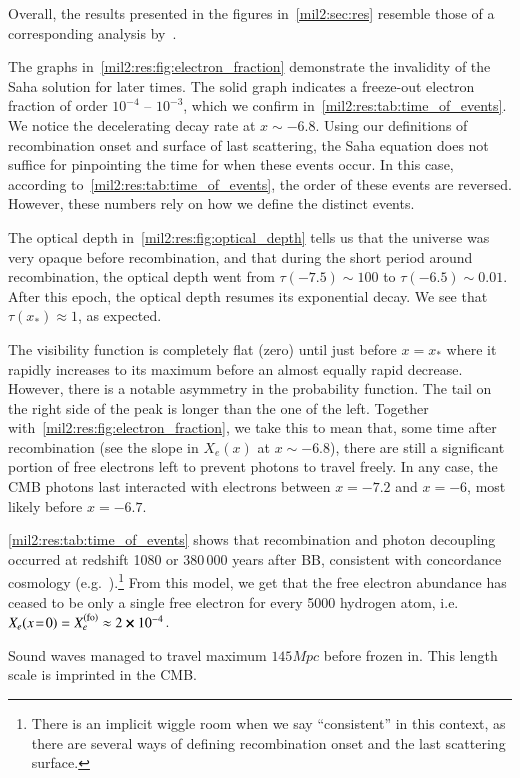 



Overall, the results presented in the figures in~\cref{mil2:sec:res} resemble those of a corresponding analysis by~\citet[see][Fig.~1,~2]{Callin2006}.


The graphs in~\cref{mil2:res:fig:electron_fraction} demonstrate the invalidity of the Saha solution for later times. The solid graph indicates a freeze-out electron fraction of order $10^{-4}$ -- $10^{-3}$, which we confirm in~\cref{mil2:res:tab:time_of_events}. We notice the decelerating decay rate at $x\sim -6.8$. Using our definitions of recombination onset and surface of last scattering, the Saha equation does not suffice for pinpointing the time for when these events occur. In this case, according to~\cref{mil2:res:tab:time_of_events}, the order of these events are reversed. However, these numbers rely on how we define the distinct events.

The optical depth in~\cref{mil2:res:fig:optical_depth} tells us that the universe was very opaque before recombination, and that during the short period around recombination, the optical depth went from $\tau(-7.5)\sim 100$ to $\tau( -6.5)\sim 0.01$. After this epoch, the optical depth resumes its exponential decay. We see that $\tau(x_*)\approx 1$, as expected. 


The visibility function is completely flat (zero) until just before $x=x_*$ where it rapidly increases to its maximum before an almost equally rapid decrease. However, there is a notable asymmetry in the probability function. The tail on the right side of the peak is longer than the one of the left. Together with~\cref{mil2:res:fig:electron_fraction}, we take this to mean that, some time after recombination (see the slope in $X_e(x)$ at $x\sim -6.8$), there are still a significant portion of free electrons left to prevent photons to travel freely. In any case, the CMB photons last interacted with electrons between $x=-7.2$ and $x=-6$, most likely before $x=-6.7$.

\cref{mil2:res:tab:time_of_events} shows that recombination and photon decoupling occurred at redshift 1080 or 380\,000 years after BB, consistent with concordance cosmology (e.g.~\citet[Tab.~3.1]{Baumann}).\footnote{There is an implicit wiggle room when we say ``consistent'' in this context, as there are several ways of defining recombination onset and the last scattering surface.} From this model, we get that the free electron abundance has ceased to be only a single free electron for every 5000 hydrogen atom, i.e.~$X_e(x\!=\!0) = X_e^\mathrm{(fo)}\approx 2\cross 10^{-4}$. 

Sound waves managed to travel maximum $145\unit{Mpc}$ before frozen in. This length scale is imprinted in the CMB. 